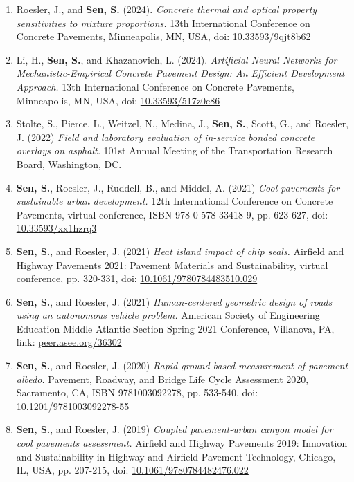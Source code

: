 \documentclass[12pt]{article}
\begin{document}
\begin{enumerate}
	\item Roesler, J., and \textbf{Sen, S.} (2024). \textit{Concrete thermal and optical property sensitivities to mixture proportions.} 13th International Conference on Concrete Pavements, Minneapolis, MN, USA, doi: \href{https://doi.org/10.33593/9qjt8b62}{10.33593/9qjt8b62}
	\item Li, H., \textbf{Sen, S.}, and Khazanovich, L. (2024). \textit{Artificial Neural Networks for Mechanistic-Empirical Concrete Pavement Design: An Efficient Development Approach.} 13th International Conference on Concrete Pavements, Minneapolis, MN, USA, doi: \href{https://doi.org/10.33593/517z0c86}{10.33593/517z0c86}
	\item Stolte, S., Pierce, L., Weitzel, N., Medina, J., \textbf{Sen, S.}, Scott, G., and Roesler, J. (2022) \textit{Field and laboratory evaluation of in-service bonded concrete overlays on asphalt.} 101st Annual Meeting of the Transportation Research Board, Washington, DC.
	\item \textbf{Sen, S.}, Roesler, J., Ruddell, B., and Middel, A. (2021) \textit{Cool pavements for sustainable urban development.} 12th International Conference on Concrete Pavements, virtual conference, ISBN 978-0-578-33418-9, pp. 623-627, doi: \href{https://doi.org/10.33593/xx1hzrq3}{10.33593/xx1hzrq3}
	\item \textbf{Sen, S.}, and Roesler, J. (2021) \textit{Heat island impact of chip seals.} Airfield and Highway Pavements 2021: Pavement Materials and Sustainability, virtual conference, pp. 320-331, doi: \href{https://doi.org/10.1061/9780784483510.029}{10.1061/9780784483510.029}
	\item \textbf{Sen, S.}, and Roesler, J. (2021) \textit{Human-centered geometric design of roads using an autonomous vehicle problem.} American Society of Engineering Education Middle Atlantic Section Spring 2021 Conference, Villanova, PA, link: \href{https://peer.asee.org/36302}{peer.asee.org/36302}
	\item \textbf{Sen, S.}, and Roesler, J. (2020) \textit{Rapid ground-based measurement of pavement albedo.} Pavement, Roadway, and Bridge Life Cycle Assessment 2020, Sacramento, CA, ISBN 9781003092278, pp. 533-540, doi: \href{https://doi.org/10.1201/9781003092278-55}{10.1201/9781003092278-55}
	\item \textbf{Sen, S.}, and Roesler, J. (2019) \textit{Coupled pavement-urban canyon model for cool pavements assessment.} Airfield and Highway Pavements 2019: Innovation and Sustainability in Highway and Airfield Pavement Technology, Chicago, IL, USA, pp. 207-215, doi: \href{http://dx.doi.org/10.1061/9780784482476.022}{10.1061/9780784482476.022}

\end{enumerate}
\end{document}
